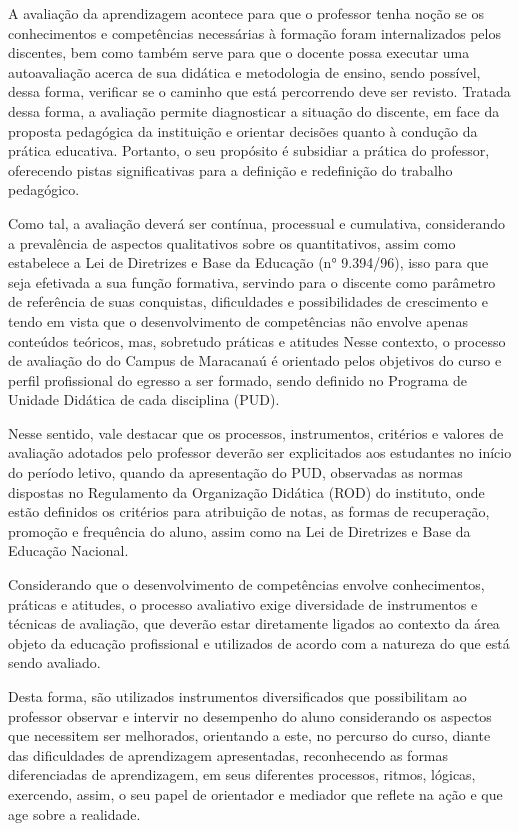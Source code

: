 \documentclass{paper}
\begin{document}
A avaliação da aprendizagem acontece para que o professor tenha noção se os conhecimentos e competências necessárias à formação foram internalizados pelos discentes, bem como também serve para que o docente possa executar uma autoavaliação acerca de sua didática e metodologia de ensino, sendo possível, dessa forma, verificar se o caminho que está percorrendo deve ser revisto. Tratada dessa forma, a avaliação permite diagnosticar a situação do discente, em face da proposta pedagógica da instituição e orientar decisões quanto à condução da prática educativa. Portanto, o seu propósito é subsidiar a prática do professor, oferecendo pistas significativas para a definição e redefinição do trabalho pedagógico.

Como tal, a avaliação deverá ser contínua, processual e cumulativa, considerando a prevalência de aspectos qualitativos sobre os quantitativos, assim como estabelece a Lei de Diretrizes e Base da Educação (n° 9.394/96), isso para que seja efetivada a sua função formativa, servindo para o discente como parâmetro de referência de suas conquistas, dificuldades e possibilidades de crescimento e tendo em vista que o desenvolvimento de competências não envolve apenas conteúdos teóricos, mas, sobretudo práticas e atitudes
Nesse contexto, o processo de avaliação do \NOMECURSO do Campus de Maracanaú é orientado pelos objetivos do curso e perfil profissional do egresso a ser formado, sendo definido no Programa de Unidade Didática de cada disciplina (PUD).

Nesse sentido, vale destacar que os processos, instrumentos, critérios e valores de avaliação adotados pelo professor deverão ser explicitados aos estudantes no início do período letivo, quando da apresentação do PUD, observadas as normas dispostas no Regulamento da Organização Didática (ROD) do instituto, onde estão definidos os critérios para atribuição de notas, as formas de recuperação, promoção e frequência do aluno, assim como na Lei de Diretrizes e Base da Educação Nacional.
 
Considerando que o desenvolvimento de competências envolve conhecimentos, práticas e atitudes, o processo avaliativo exige diversidade de instrumentos e técnicas de avaliação, que deverão estar diretamente ligados ao contexto da área objeto da educação profissional e utilizados de acordo com a natureza do que está sendo avaliado.

Desta forma, são utilizados instrumentos diversificados que possibilitam ao professor observar e intervir no desempenho do aluno considerando os aspectos que necessitem ser melhorados, orientando a este, no percurso do curso, diante das dificuldades de aprendizagem apresentadas, reconhecendo as formas diferenciadas de aprendizagem, em seus diferentes processos, ritmos, lógicas, exercendo, assim, o seu papel de orientador e mediador que reflete na ação e que age sobre a realidade. 
\end{document}
